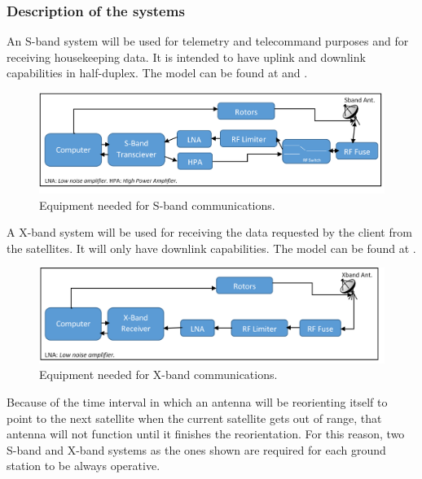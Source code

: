 \subsubsection{Description of the systems}
An S-band system will be used for telemetry and telecommand purposes and for receiving housekeeping data. It is intended to have uplink and downlink capabilities in half-duplex. The model can be found at \cite{SBand} and \cite{SBandDatasheet}.
\begin{figure}[H]
\begin{center}
\includegraphics[scale=0.1]{SbandEquip.PNG}
\caption[S-band Equipment]{Equipment needed for S-band communications.}
\label{fig:SbandEquip}
\end{center}
\end{figure}

A X-band system will be used for receiving the data requested by the client from the satellites. It will only have downlink capabilities. The model can be found at \cite{XBand}.
\begin{figure}[H]
\begin{center}
\includegraphics[scale=0.1]{XbandEquip.PNG}
\caption[X-band Equipment]{Equipment needed for X-band communications.}
\label{fig:XbandEquip}
\end{center}
\end{figure}

Because of the time interval in which an antenna will be reorienting itself to point to the next satellite when the current satellite gets out of range, that antenna will not function until it finishes the reorientation. For this reason, two S-band and X-band systems as the ones shown are required for each ground station to be always operative.

